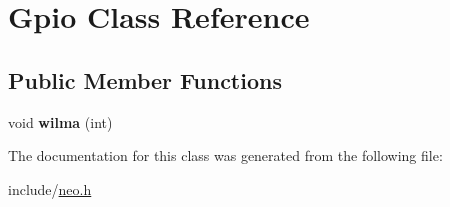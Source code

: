 \hypertarget{classGpio}{}\section{Gpio Class Reference}
\label{classGpio}
\subsection*{Public Member Functions}
\begin{DoxyCompactItemize}
\item 
\hypertarget{classGpio_a0a42e392755f3e36a92749f2ce42c723}{}\label{classGpio_a0a42e392755f3e36a92749f2ce42c723} 
void {\bfseries wilma} (int)
\end{DoxyCompactItemize}


The documentation for this class was generated from the following file\+:\begin{DoxyCompactItemize}
\item 
include/\hyperlink{neo_8h}{neo.\+h}\end{DoxyCompactItemize}
